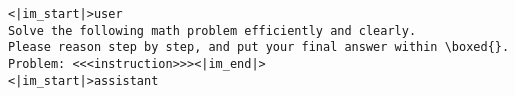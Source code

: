 \begin{tcolorbox}[brown_box, title = {{Prompt Template 1.1 --- Generator generates initial solution}}]\tiny
\begin{verbatim}
<|im_start|>user
Solve the following math problem efficiently and clearly.
Please reason step by step, and put your final answer within \boxed{}.
Problem: <<<instruction>>><|im_end|>
<|im_start|>assistant
\end{verbatim}
\end{tcolorbox}
